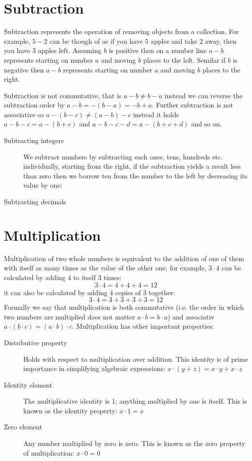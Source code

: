 \section{Subtraction}
Subtraction represents the operation of removing objects from a
collection. For example, $5-2$ can be though of as if you have $5$ apples
and take $2$ away, then you have $3$ apples left. Assuming $b$ is
positive then on a number line $a-b$ represents starting on number $a$
and moving $b$ places to the left. Semilar if $b$ is negative then $a-b$
represents starting on number $a$ and moving $b$ places to the right.

Subtraction is not commutative, that is $a - b \neq b - a$ instead we can
reverse the subtraction order by $a - b = -(b - a) = -b + a$. Further
subtraction is not associative so $a  - (b - c) \neq (a - b) - c$ instead
it holds $a - b - c = a - (b + c)$ and $a - b - c - d = a - (b + c + d)$
and so on.
\begin{description}
\item [Subtracting integers] We subtract numbers by subtracting each
ones, tens, hundreds etc. individually, starting from the right, if the
subtraction yields a result less than zero then we borrow ten from the
number to the left by decreasing its value by one: 
\begin{figure}[H]
\centering
{}
\end{figure}
\item [Subtracting decimals]
\end{description}

\section{Multiplication}
Multiplication of two whole numbers is equivalent to the addition of one
of them with itself as many times as the value of the other one; for
example, $3 \cdot 4$ can be calculated by adding $4$ to itself $3$ times:
\[
3 \cdot 4 = 4 + 4 + 4 = 12
\]
it can also be calculated by adding $4$ copies of $3$ together:
\[
3 \cdot 4 = 3 + 3 + 3 + 3 = 12
\]
Formally we say that multiplication is both commutative (i.e. the order
in which two numbers are multiplied does not matter
$a \cdot b = b \cdot a$) and associativ
$a \cdot (b \cdot c) = (a \cdot b) \cdot c$. Multiplication has other
important properties:
\begin{description}
\item [Distributive property] Holds with respect to multiplication over
addition. This identity is of prime importance in simplifying algebraic
expressions: $x\cdot(y + z) = x\cdot y + x\cdot z$
\item [Identity element] The multiplicative identity is 1; anything
multiplied by one is itself. This is known as the identity property:
$x\cdot 1 = x$
\item [Zero element] Any number multiplied by zero is zero. This is known
as the zero property of multiplication: $x\cdot  0 = 0$
\end{description}

